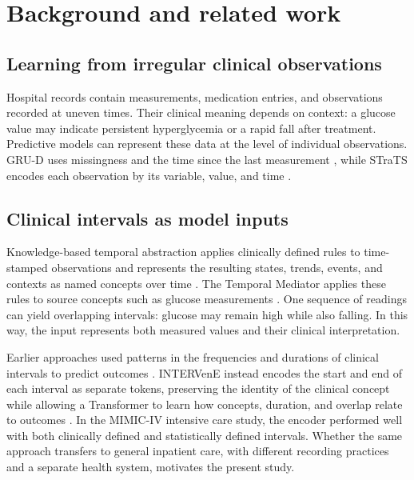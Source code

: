 \section{Background and related work}
\label{sec:background}
\subsection{Learning from irregular clinical observations}
Hospital records contain measurements, medication entries, and observations recorded at uneven times. Their clinical meaning depends on context: a glucose value may indicate persistent hyperglycemia or a rapid fall after treatment. Predictive models can represent these data at the level of individual observations. GRU-D uses missingness and the time since the last measurement \citep{che2018recurrent}, while STraTS encodes each observation by its variable, value, and time \citep{tipirneni2022strats}.

\subsection{Clinical intervals as model inputs}
Knowledge-based temporal abstraction applies clinically defined rules to time-stamped observations and represents the resulting states, trends, events, and contexts as named concepts over time \citep{shahar1997framework}. The Temporal Mediator applies these rules to source concepts such as glucose measurements \citep{mediator-github}. One sequence of readings can yield overlapping intervals: glucose may remain high while also falling. In this way, the input represents both measured values and their clinical interpretation.

Earlier approaches used patterns in the frequencies and durations of clinical intervals to predict outcomes \citep{moskovitch2015karmalego,sheetrit2019tpf}. INTERVenE instead encodes the start and end of each interval as separate tokens, preserving the identity of the clinical concept while allowing a Transformer to learn how concepts, duration, and overlap relate to outcomes \citep{oded2026intervene}. In the MIMIC-IV intensive care study, the encoder performed well with both clinically defined and statistically defined intervals. Whether the same approach transfers to general inpatient care, with different recording practices and a separate health system, motivates the present study.

